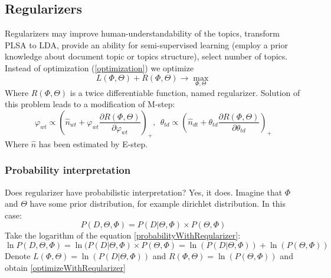     \subsection{Regularizers} \label{Regularizers}
	Regularizers may improve human-understandability of the topics, transform PLSA to LDA, provide an ability
	for semi-supervised learning (employ a prior knowledge about document topic or topics structure), select number of topics.
	Instead of optimization (\ref{optimization}) we optimize
	\begin{equation} \label{optimizeWithReqularizer} L(\Phi, \Theta) + R(\Phi, \Theta) \to \max_{\Phi, \Theta} \end{equation}
	Where $R(\Phi, \Theta)$ is a twice differentiable function, named regularizer.
	Solution of this problem leads to a modification of M\--step:
	\begin{equation}
	    \label{RegularizersEquation}
	    \varphi_{wt} \propto \left(\hat{n}_{wt} + \varphi_{wt} \frac{\partial  R(\Phi, \Theta)}{\partial \varphi_{wt}} \right)_+ ,\ \
	    \theta_{td} \propto \left(\hat{n}_{dt} + \theta_{td}\frac{\partial  R(\Phi, \Theta)}{\partial \theta_{td}} \right)_+
	\end{equation}
	Where $\hat{n}$ has been estimated by E\--step.

	\subsubsection{Probability interpretation}
	    Does regularizer have probabilistic interpretation? Yes, it does. Imagine that $\Phi$ and $\Theta$ have some prior distribution, for example
	    dirichlet distribution. In this case:
	    \begin{equation} \label{probabilityWithReqularizer} P(D, \Theta, \Phi) = P(D| \Theta, \Phi) \times P(\Theta, \Phi) \end{equation}
	    Take the logarithm of the equation \ref{probabilityWithReqularizer}:
	    \begin{equation} \ln P(D, \Theta, \Phi) = \ln(P(D| \Theta, \Phi) \times P(\Theta, \Phi) = \ln(P(D| \Theta, \Phi)) + \ln(P(\Theta, \Phi)) \end{equation}
	    Denote $L(\Phi, \Theta) = \ln(P(D| \Theta, \Phi))$ and $R(\Phi, \Theta) = \ln(P(\Theta, \Phi))$ and obtain \ref{optimizeWithReqularizer}

